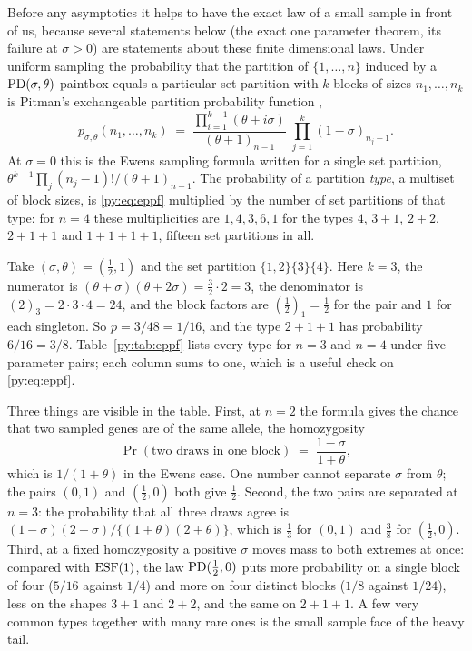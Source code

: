 Before any asymptotics it helps to have the exact law of a small sample in front of us, because
several statements below (the exact one parameter theorem, its failure at $\sigma > 0$) are
statements about these finite dimensional laws. Under uniform sampling the probability that the
partition of $\{1,\dots,n\}$ induced by a $\mathrm{PD}(\sigma,\theta)$ paintbox equals a particular set
partition with $k$ blocks of sizes $n_1,\dots,n_k$ is Pitman's exchangeable partition probability
function \citep{py:pitman1995},
\begin{equation}
p_{\sigma,\theta}(n_1,\dots,n_k) \;=\;
\frac{\prod_{i=1}^{k-1}(\theta+i\sigma)}{(\theta+1)_{n-1}}\;\prod_{j=1}^{k}(1-\sigma)_{n_j-1} .
\label{py:eq:eppf}
\end{equation}
At $\sigma = 0$ this is the Ewens sampling formula written for a single set partition,
$\theta^{k-1}\prod_j (n_j-1)!/(\theta+1)_{n-1}$. The probability of a partition \emph{type}, a
multiset of block sizes, is \eqref{py:eq:eppf} multiplied by the number of set partitions of that
type: for $n = 4$ these multiplicities are $1, 4, 3, 6, 1$ for the types $4$, $3{+}1$, $2{+}2$,
$2{+}1{+}1$ and $1{+}1{+}1{+}1$, fifteen set partitions in all.

\begin{example}[Pitman's formula at $n = 3$ and $n = 4$]
\label{py:ex:eppf}
Take $(\sigma,\theta) = (\tfrac12, 1)$ and the set partition $\{1,2\}\{3\}\{4\}$. Here $k = 3$, the
numerator is $(\theta+\sigma)(\theta+2\sigma) = \tfrac32\cdot 2 = 3$, the denominator is
$(2)_3 = 2\cdot3\cdot4 = 24$, and the block factors are $(\tfrac12)_1 = \tfrac12$ for the pair and
$1$ for each singleton. So $p = 3/48 = 1/16$, and the type $2{+}1{+}1$ has probability
$6/16 = 3/8$. Table~\ref{py:tab:eppf} lists every type for $n = 3$ and $n = 4$ under five parameter
pairs; each column sums to one, which is a useful check on \eqref{py:eq:eppf}.

Three things are visible in the table. First, at $n = 2$ the formula gives the chance that two
sampled genes are of the same allele, the homozygosity
\[
\Pr(\text{two draws in one block}) \;=\; \frac{1-\sigma}{1+\theta},
\]
which is $1/(1+\theta)$ in the Ewens case. One number cannot separate $\sigma$ from $\theta$; the
pairs $(0,1)$ and $(\tfrac12,0)$ both give $\tfrac12$. Second, the two pairs are separated at
$n = 3$: the probability that all three draws agree is $(1-\sigma)(2-\sigma)/\{(1+\theta)(2+\theta)\}$,
which is $\tfrac13$ for $(0,1)$ and $\tfrac38$ for $(\tfrac12,0)$. Third, at a fixed homozygosity a positive $\sigma$ moves
mass to both extremes at once: compared with $\mathrm{ESF}(1)$, the law $\mathrm{PD}(\tfrac12,0)$ puts more
probability on a single block of four ($5/16$ against $1/4$) and more on four distinct blocks
($1/8$ against $1/24$), less on the shapes $3{+}1$ and $2{+}2$, and the same on $2{+}1{+}1$. A few very common types together with
many rare ones is the small sample face of the heavy tail.
\end{example}

